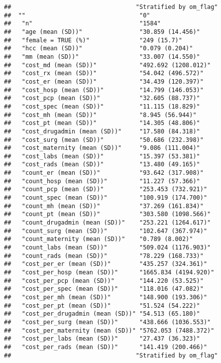 \documentclass[]{article}
\begin{document}
\begin{verbatim}
##                                   "Stratified by om_flag"
##  ""                                "0"                  
##   "n"                              "1584"               
##   "age (mean (SD))"                "30.859 (14.456)"    
##   "female = TRUE (%)"              "249 (15.7)"         
##   "hcc (mean (SD))"                "0.079 (0.204)"      
##   "mm (mean (SD))"                 "33.007 (14.550)"    
##   "cost_md (mean (SD))"            "492.692 (1208.012)" 
##   "cost_rx (mean (SD))"            "54.042 (496.572)"   
##   "cost_er (mean (SD))"            "34.439 (120.397)"   
##   "cost_hosp (mean (SD))"          "14.799 (146.053)"   
##   "cost_pcp (mean (SD))"           "32.605 (88.737)"    
##   "cost_spec (mean (SD))"          "11.115 (18.829)"    
##   "cost_mh (mean (SD))"            "8.945 (56.944)"     
##   "cost_pt (mean (SD))"            "14.305 (48.806)"    
##   "cost_drugadmin (mean (SD))"     "17.580 (84.318)"    
##   "cost_surg (mean (SD))"          "50.686 (232.398)"   
##   "cost_maternity (mean (SD))"     "9.086 (111.004)"    
##   "cost_labs (mean (SD))"          "15.397 (53.381)"    
##   "cost_rads (mean (SD))"          "13.480 (49.165)"    
##   "count_er (mean (SD))"           "93.642 (317.908)"   
##   "count_hosp (mean (SD))"         "11.227 (57.366)"    
##   "count_pcp (mean (SD))"          "253.453 (732.921)"  
##   "count_spec (mean (SD))"         "100.919 (174.700)"  
##   "count_mh (mean (SD))"           "37.269 (161.834)"   
##   "count_pt (mean (SD))"           "303.580 (1098.566)" 
##   "count_drugadmin (mean (SD))"    "253.221 (1264.617)" 
##   "count_surg (mean (SD))"         "102.647 (367.974)"  
##   "count_maternity (mean (SD))"    "0.789 (8.002)"      
##   "count_labs (mean (SD))"         "509.024 (1176.903)" 
##   "count_rads (mean (SD))"         "78.229 (168.733)"   
##   "cost_per_er (mean (SD))"        "435.257 (324.361)"  
##   "cost_per_hosp (mean (SD))"      "1665.834 (4194.920)"
##   "cost_per_pcp (mean (SD))"       "144.220 (53.525)"   
##   "cost_per_spec (mean (SD))"      "118.016 (47.082)"   
##   "cost_per_mh (mean (SD))"        "148.900 (193.306)"  
##   "cost_per_pt (mean (SD))"        "51.524 (54.222)"    
##   "cost_per_drugadmin (mean (SD))" "54.513 (65.180)"    
##   "cost_per_surg (mean (SD))"      "438.666 (1036.553)" 
##   "cost_per_maternity (mean (SD))" "5762.053 (7488.372)"
##   "cost_per_labs (mean (SD))"      "27.437 (36.323)"    
##   "cost_per_rads (mean (SD))"      "141.419 (200.466)"  
##                                   "Stratified by om_flag"

\end{verbatim}
\end{document}

